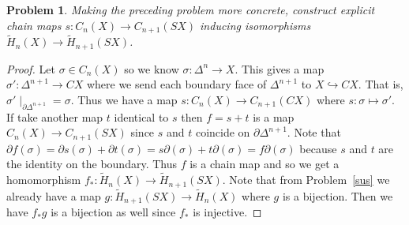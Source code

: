 \documentclass{article}
\newtheorem{problem}{Problem}
\begin{document}
\begin{problem}
Making the preceding problem more concrete, construct explicit chain maps $s : C_n(X) \to C_{n+1}(SX)$ inducing isomorphisms $\widetilde{H}_n(X) \to \widetilde{H}_{n+1}(SX)$.
\end{problem}
\begin{proof}
Let $\sigma \in C_n(X)$ so we know $\sigma : \Delta^n \to X$. This gives a map $\sigma' : \Delta^{n+1} \to CX$ where we send each boundary face of $\Delta^{n+1}$ to $X \hookrightarrow CX$. That is, $\sigma' \mid_{\partial \Delta^{n+1}} = \sigma$. Thus we have a map $s : C_n(X) \to C_{n+1}(CX)$ where $s : \sigma \mapsto \sigma'$. If take another map $t$ identical to $s$ then $f = s + t$ is a map $C_n(X) \to C_{n+1}(SX)$ since $s$ and $t$ coincide on $\partial \Delta^{n+1}$. Note that $\partial f (\sigma) = \partial s(\sigma) + \partial t(\sigma) = s \partial (\sigma) + t \partial (\sigma) = f \partial (\sigma)$ because $s$ and $t$ are the identity on the boundary. Thus $f$ is a chain map and so we get a homomorphism $f_* : \widetilde{H}_n(X) \to \widetilde{H}_{n+1}(SX)$. Note that from Problem~\ref{sus} we already have a map $g : \widetilde{H}_{n+1}(SX) \to \widetilde{H}_n(X)$ where $g$ is a bijection. Then we have $f_*g$ is a bijection as well since $f_*$ is injective.
\end{proof}
\end{document}
